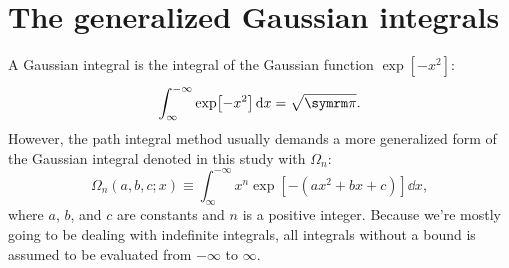 \chapter{The generalized Gaussian integrals}

A Gaussian integral is the integral of the Gaussian function $\exp[-x^2]$:
\begin{equation}
    \int_{\infty}^{-\infty} \exp[-x^2]\dd{x} = \sqrt{\cpi}.
\end{equation}
However, the path integral method usually demands a more generalized form of the Gaussian integral denoted in this study with $\Omega_n$:
\begin{equation}
    \Omega_n(a, b, c; x) \equiv \int_{\infty}^{-\infty} x^n\exp[-(ax^2 + bx + c)]\dd{x},\label{eq:generalized_gaussian}
\end{equation}
where $a$, $b$, and $c$ are constants and $n$ is a positive integer. Because we're mostly going to be dealing with indefinite integrals, all integrals without a bound is assumed to be evaluated from $-\infty$ to $\infty$.

